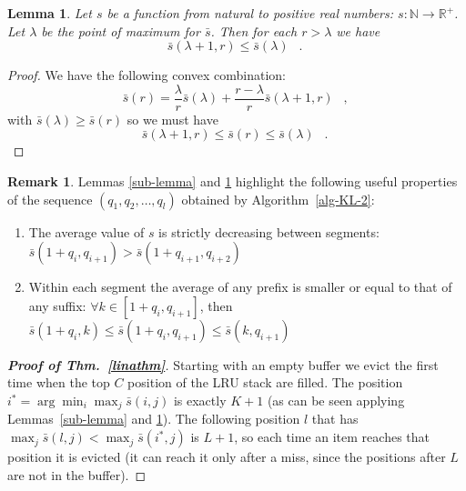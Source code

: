 \documentclass[11pt,a4paper]{article}
\DeclareMathOperator{\mf}{\enspace .}
\DeclareMathOperator{\mc}{\enspace ,}
\newtheorem{lemma}{Lemma}
\theoremstyle{definition}
\newtheorem{remark}{Remark}
\theoremstyle{remark}
\begin{document}
\begin{lemma}
  \label{sub-lemma-2}
  Let \(s\) be a function from natural to positive real numbers: \(s: \mathbb{N}
  \rightarrow \mathbb{R}^+ \).  Let \(\lambda\) be the point of maximum for
  \(\bar s\).  Then for each \(r>\lambda\) we have
  \begin{equation}
  \bar s(\lambda+1,r) \leq \bar s(\lambda) \mf
  \end{equation}
\end{lemma}
\begin{proof}
  We have the following convex combination:
  \begin{equation}
  \bar s(r)= \frac{\lambda}{r} \bar s(\lambda) + \frac{r-\lambda}{r} \bar s(\lambda+1,r) \mc
  \end{equation}
  with \(\bar s(\lambda) \geq \bar s(r)\) so we must have
  \begin{equation}
  \bar s(\lambda+1,r) \leq \bar s(r) \leq \bar s(\lambda) \mf
  \end{equation}
\end{proof}
\begin{remark}
  Lemmas \ref{sub-lemma} and \ref{sub-lemma-2} highlight the following
  useful properties of the sequence $(q_1,q_2, \ldots, q_l)$ obtained by
  Algorithm~\ref{alg-KL-2}:
  \begin{enumerate}
  \item The average value of $s$ is strictly decreasing between segments: $\bar
    s(1+q_i,q_{i+1}) > \bar s(1+q_{i+1},q_{i+2})$
  \item Within each segment the average of any prefix is smaller or equal to
    that of any suffix: $\forall k \in [1+q_i,q_{i+1}]$, then $\bar s(1+q_i,k) \leq
    \bar s(1+q_i,q_{i+1}) \leq \bar s(k,q_{i+1})$
  \end{enumerate}
\end{remark}
\begin{proof}[{\bf Proof of Thm.~\ref{linathm}}]
  Starting with an empty buffer we evict the first time when the top $C$
  position of the LRU stack are filled. The position $i^* = \arg \min_i \max_j
  \bar s(i,j)$ is exactly $K+1$ (as can be seen applying Lemmas~\ref{sub-lemma}
  and \ref{sub-lemma-2}). The following position $l$ that has $\max_j
  \bar s(l,j)< \max_j \bar s(i^*,j)$ is $L+1$, so each time an item reaches that
  position it is evicted (it can reach it only after a miss, since the positions
  after $L$ are not in the buffer).
\end{proof}
\end{document}

